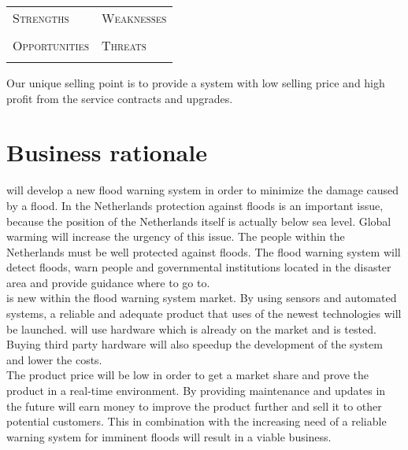 \begin{tabular}{L{} | L{}}
	\toprule
	
	\textsc{\Large Strengths} & \textsc{\Large Weaknesses} \\
	 \Strengths &   \Weaknesses \\
	\midrule
	\textsc{\Large Opportunities} & \textsc{\Large Threats} \\
	 \Opportunities &  \Threats \\
\end{tabular}

%

Our unique selling point is to provide a system with low selling price and high profit from the service contracts and upgrades.

\section{Business rationale}
\CompanyName{} will develop a new flood warning system in order to minimize the damage caused by a flood. In the Netherlands protection against floods is an important issue, because the position of the Netherlands itself is actually below sea level. Global warming will increase the urgency of this issue. The people within the Netherlands must be well protected against floods. The flood warning system will detect floods, warn people and governmental institutions located in the disaster area and provide guidance where to go to. 
\\
\CompanyName{} is new within the flood warning system market. By using sensors and automated systems, a reliable and adequate product that uses of the newest technologies will be launched. \CompanyName{} will use hardware which is already on the market and is tested. Buying third party hardware will also speedup the development of the system and lower the costs.\\

The product price will be low in order to get a market share and prove the product in a real-time environment. By providing maintenance and updates in the future \CompanyName{} will earn money to improve the product further and sell it to other potential customers. This in combination with the increasing need of a reliable warning system for imminent floods will result in a viable business.\\


